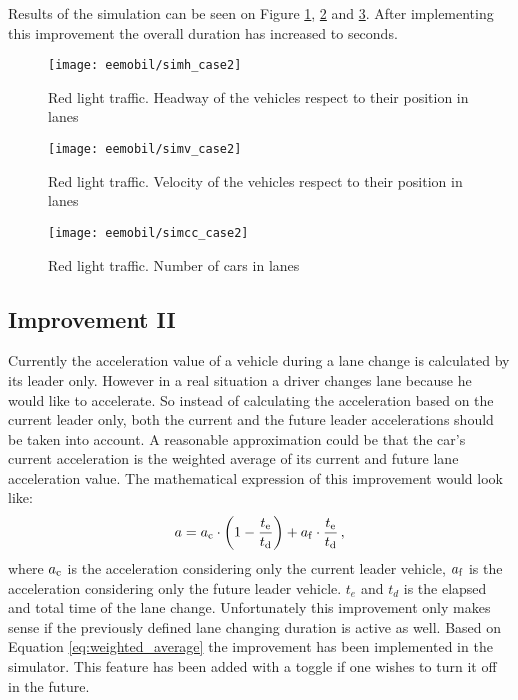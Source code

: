 		Results of the simulation can be seen on Figure \ref{fig:red_light_situationh_impr1}, \ref{fig:red_light_situationv_impr1} and \ref{fig:red_light_situationcc_impr1}. After implementing this improvement the overall duration has increased to seconds.
		\begin{figure}[ht]
			\centering
			\texttt{[image: eemobil/simh\_case2]}
			\caption{Red light traffic. Headway of the vehicles respect to their position in lanes}
			\label{fig:red_light_situationh_impr1}
		\end{figure}
		\begin{figure}[ht]
			\centering
			\texttt{[image: eemobil/simv\_case2]}
			\caption{Red light traffic. Velocity of the vehicles respect to their position in lanes}
			\label{fig:red_light_situationv_impr1}
		\end{figure}
		\begin{figure}[ht]
			\centering
			\texttt{[image: eemobil/simcc\_case2]}
			\caption{Red light traffic. Number of cars in lanes }
			\label{fig:red_light_situationcc_impr1}
		\end{figure}
		\subsection{Improvement II}
		Currently the acceleration value of a vehicle during a lane change is calculated by its leader only. However in a real situation a driver changes lane because he would like to accelerate. So instead of calculating the acceleration based on the current leader only, both the current and the future leader accelerations should be taken into account. A reasonable approximation could be that the car's current acceleration is the weighted average of its current and future lane acceleration value. The mathematical expression of this improvement would look like:
		\begin{equation}
			a=a_{\rm c} \cdot \left(1-\frac{t_{\rm e}}{t_{\rm d}}\right) + a_{\rm f}\cdot \frac{t_{\rm e}}{t_{\rm d}}\,,
			\label{eq:weighted_average}
		\end{equation}
		where $a_{\rm c}$ is the acceleration considering only the current leader vehicle, $a_{\rm f}$  is the acceleration considering only the future leader vehicle. $t_e$ and $t_d$ is the elapsed and total time of the lane change. Unfortunately this improvement only makes sense if the previously defined lane changing duration is active as well. Based on Equation \ref{eq:weighted_average} the improvement has been implemented in the simulator. This feature has been added with a toggle if one wishes to turn it off in the future.
		
